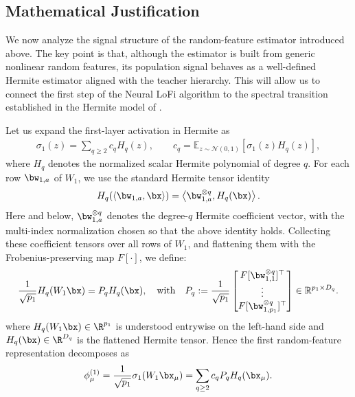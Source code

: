 \subsection{Mathematical Justification}\label{2605:gif:rf_maths}

We now analyze the signal structure of the random-feature estimator introduced above. The key point is that, although the estimator is built from generic nonlinear random features, its population signal behaves as a well-defined Hermite estimator aligned with the teacher hierarchy. This will allow us to connect the first step of the Neural LoFi algorithm to the spectral transition established in the Hermite model of \cite{tabanelli2026deep}.

Let us expand the first-layer activation in Hermite as
\begin{align}
    \sigma_1(z)
    =
    \sum_{q\geq 2}
    c_q H_q(z),
    \qquad
    c_q
    =
    \mathbb E_{z\sim \mathcal N(0,1)}
    \left[
        \sigma_1(z)H_q(z)
    \right],
\end{align}
where $H_q$ denotes the normalized scalar Hermite polynomial of degree $q$.
For each row $\bw_{1,a}$ of $W_1$, we use the standard Hermite tensor identity
\begin{align}
    H_q(\langle \bw_{1,a},\bx\rangle)
    =
    \left\langle
        \bw_{1,a}^{\otimes q},
        H_q(\bx)
    \right\rangle .
\end{align}
Here and below, $\bw_{1,a}^{\otimes q}$ denotes the degree-$q$ Hermite coefficient vector, with the multi-index normalization chosen so that the above identity holds. Collecting these coefficient tensors over all rows of $W_1$, and flattening them with the Frobenius-preserving map $F[\cdot]$, we define:
\begin{align}
    \frac{1}{\sqrt{p_1}} H_q(W_1\bx)
    =
    P_q H_q(\bx),\quad \textrm{with} \quad P_q
    :=
    \frac1{\sqrt{p_1}}
    \begin{bmatrix}
        F[\bw_{1,1}^{\otimes q}]^\top \\
        \vdots \\
        F[\bw_{1,p_1}^{\otimes q}]^\top
    \end{bmatrix}
    \in \mathbb R^{p_1\times D_q}.
\end{align}
where $H_q(W_1\bx)\in\R^{p_1}$ is understood entrywise on the left-hand side and $H_q(\bx)\in \R^{D_q}$ is the flattened Hermite tensor. Hence the first random-feature representation decomposes as
\begin{align}
    \phi_\mu^{(1)}
    =
    \frac{1}{\sqrt{p_1}}\sigma_1(W_1\bx_\mu)
    =
    \sum_{q\geq 2}
    c_q
    P_q H_q(\bx_\mu).
\end{align}

